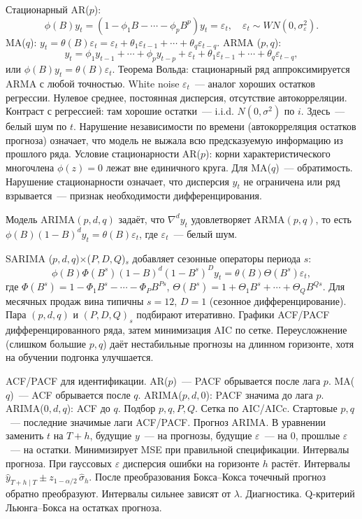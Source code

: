 Стационарный AR($p$): \[ \phi(B)y_t=(1-\phi_1 B-\cdots-\phi_p B^p)y_t=\varepsilon_t, \quad \varepsilon_t\sim WN(0,\sigma_\varepsilon^2).
\] MA($q$): $y_t=\theta(B)\varepsilon_t=\varepsilon_t+\theta_1\varepsilon_{t-1}+\cdots+\theta_q\varepsilon_{t-q}$.
ARMA ($p,q$): \[ y_t=\phi_1 y_{t-1}+\cdots+\phi_p y_{t-p} +\varepsilon_t+\theta_1\varepsilon_{t-1}+\cdots+\theta_q\varepsilon_{t-q}, \] или $\phi(B)y_t=\theta(B)\varepsilon_t$.
Теорема Вольда: стационарный ряд аппроксимируется ARMA с любой точностью.
White noise $\varepsilon_t$~--- аналог хороших остатков регрессии. Нулевое среднее, постоянная дисперсия, отсутствие автокорреляции.
Контраст с регрессией: там хорошие остатки~--- i.i.d.
$N(0,\sigma^2)$ по $i$. Здесь~--- белый шум по $t$. Нарушение независимости по времени (автокорреляция остатков прогноза) означает, что модель не выжала всю предсказуемую информацию из прошлого ряда.
Условие стационарности AR($p$): корни характеристического многочлена $\phi(z)=0$ лежат вне единичного круга. Для MA($q$)~--- обратимость.
Нарушение стационарности означает, что дисперсия $y_t$ не ограничена или ряд взрывается~--- признак необходимости дифференцирования.

\begin{definition}
Модель ARIMA$(p,d,q)$ задаёт, что $\nabla^d y_t$ удовлетворяет ARMA$(p,q)$, то есть $\phi(B)(1-B)^d y_t=\theta(B)\varepsilon_t$, где $\varepsilon_t$~--- белый шум.
\end{definition}

SARIMA ($p,d,q$)$\times$($P,D,Q$)$_s$ добавляет сезонные операторы периода $s$: \[ \phi(B)\Phi(B^s)(1-B)^d(1-B^s)^D y_t =\theta(B)\Theta(B^s)\varepsilon_t, \] где $\Phi(B^s)=1-\Phi_1 B^s-\cdots-\Phi_P B^{Ps}$, $\Theta(B^s)=1+\Theta_1 B^s+\cdots+\Theta_Q B^{Qs}$.
Для месячных продаж вина типичны $s=12$, $D=1$ (сезонное дифференцирование).
Пара $(p,d,q)$ и $(P,D,Q)_s$ подбирают итеративно. Графики ACF/PACF дифференцированного ряда, затем минимизация AIC по сетке.
Переусложнение (слишком большие $p,q$) даёт нестабильные прогнозы на длинном горизонте, хотя на обучении подгонка улучшается.

ACF/PACF для идентификации. AR($p$)~--- PACF обрывается после лага $p$. MA($q$)~--- ACF обрывается после $q$.
ARIMA($p,d,0$): PACF значима до лага $p$. ARIMA($0,d,q$): ACF до $q$.
Подбор $p,q,P,Q$. Сетка по AIC/AICc. Стартовые $p,q$~--- последние значимые лаги ACF/PACF.
Прогноз ARIMA. В уравнении заменить $t$ на $T+h$, будущие $y$~--- на прогнозы, будущие $\varepsilon$~--- на 0, прошлые $\varepsilon$~--- на остатки. Минимизирует MSE при правильной спецификации.
Интервалы прогноза. При гауссовых $\varepsilon$ дисперсия ошибки на горизонте $h$ растёт. Интервалы $\hat y_{T+h\mid T}\pm z_{1-\alpha/2}\,\hat\sigma_h$.
После преобразования Бокса--Кокса точечный прогноз обратно преобразуют. Интервалы сильнее зависят от $\lambda$.
Диагностика. Q-критерий Льюнга--Бокса на остатках прогноза.


